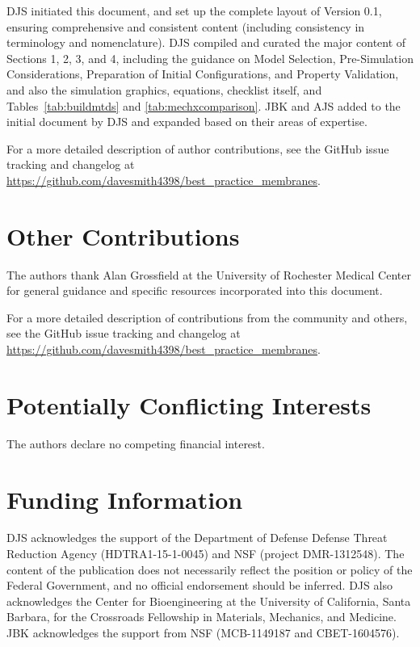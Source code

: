 \documentclass[9pt,bestpractices]{livecoms}
\newcommand{\githubrepository}{\url{https://github.com/davesmith4398/best_practice_membranes}}  %
\begin{document}
DJS initiated this document, and set up the complete layout of Version 0.1, ensuring comprehensive and consistent content (including consistency in terminology and nomenclature).
DJS compiled and curated the major content of Sections 1, 2, 3, and 4, including the guidance on Model Selection, Pre-Simulation Considerations, Preparation of Initial Configurations, and Property Validation, and also the simulation graphics, equations, checklist itself, and Tables~\ref{tab:buildmtds} and \ref{tab:mechxcomparison}.
JBK and AJS added to the initial document by DJS and expanded based on their areas of expertise. 

For a more detailed description of author contributions,
see the GitHub issue tracking and changelog at \githubrepository.

\section{Other Contributions}
%

The authors thank Alan Grossfield at the University of Rochester Medical Center for general guidance and specific resources incorporated into this document.

For a more detailed description of contributions from the community and others, see the GitHub issue tracking and changelog at \githubrepository.

\section{Potentially Conflicting Interests}

The authors declare no competing financial interest.

\section{Funding Information}
DJS acknowledges the support of the Department of Defense Defense Threat Reduction Agency (HDTRA1-15-1-0045) and NSF (project DMR-1312548).
The content of the publication does not necessarily reflect the position or policy of the Federal Government, and no official endorsement should be inferred.
DJS also acknowledges the Center for Bioengineering at the University of California, Santa Barbara, for the Crossroads Fellowship in Materials, Mechanics, and Medicine.
JBK acknowledges the support from NSF (MCB-1149187 and CBET-1604576).

\medskip

%



\end{document}
